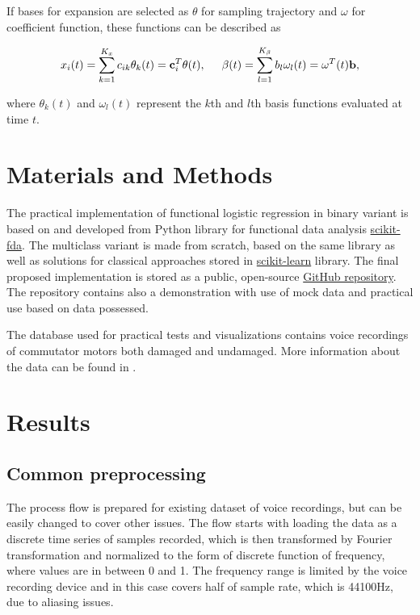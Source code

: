 \documentclass[energies,article,submit,pdftex,moreauthors]{Definitions/mdpi}
\begin{document}
If bases for expansion are selected as $\theta$ for sampling trajectory and $\omega$ for coefficient function, these functions can be described as
\begin{linenomath}
\begin{equation}
x_i(t) = \sum_{k=1}^{K_x} c_{ik} \theta_k (t) = {\bf c}_i^T \theta (t),
\hspace{5mm} \beta(t) = \sum_{l=1}^{K_{\beta}} b_l \omega_l (t) = \omega^T (t) {\bf b},
\end{equation}
\end{linenomath}
where $\theta_k (t)$ and $\omega_l (t)$ represent the $k$th and $l$th basis functions evaluated at time $t$.


\section{Materials and Methods}

The practical implementation of functional logistic regression in binary variant is based on and developed from Python library for functional data analysis \href{https://fda.readthedocs.io/en/latest/index.html}{scikit-fda}. The multiclass variant is made from scratch, based on the same library as well as solutions for classical approaches stored in \href{https://scikit-learn.org/}{scikit-learn} library. The final proposed implementation is stored as a public, open-source \href{https://github.com/Porbi96/fda-time-series-classification}{GitHub repository}. The repository contains also a demonstration with use of mock data and practical use based on data possessed.

The database used for practical tests and visualizations contains voice recordings of commutator motors both damaged and undamaged. More information about the data can be found in \cite{ref-motors}.

\section{Results}

\subsection{Common preprocessing}

The process flow is prepared for existing dataset of voice recordings, but can be easily changed to cover other issues. The flow starts with loading the data as a discrete time series of samples recorded, which is then transformed by Fourier transformation and normalized to the form of discrete function of frequency, where values are in between 0 and 1. The frequency range is limited by the voice recording device and in this case covers half of sample rate, which is 44100Hz, due to aliasing issues.
\end{document}
